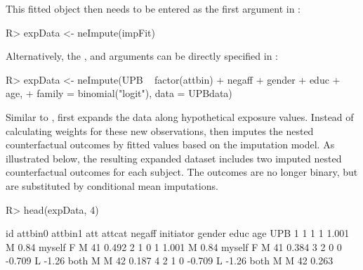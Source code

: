 \documentclass[nojss]{jss}
\begin{document}
\par This fitted object then needs to be entered as the first argument in :
\begin{Schunk}
\begin{Sinput}
R> expData <- neImpute(impFit)
\end{Sinput}
\end{Schunk}
Alternatively, the ,  and  arguments can be directly specified in :
\begin{Schunk}
\begin{Sinput}
R> expData <- neImpute(UPB ~ factor(attbin) + negaff + gender + educ + age,
+    family = binomial("logit"), data = UPBdata)
\end{Sinput}
\end{Schunk}
Similar to ,  first expands the data along hypothetical exposure values. Instead of calculating weights for these new observations,  then imputes the nested counterfactual outcomes by fitted values based on the imputation model. As illustrated below, the resulting expanded dataset includes two imputed nested counterfactual outcomes for each subject. The outcomes are no longer binary, but are substituted by conditional mean imputations.
\begin{Schunk}
\begin{Sinput}
R> head(expData, 4)
\end{Sinput}
\begin{Soutput}
  id attbin0 attbin1    att attcat negaff initiator gender educ age   UPB
1  1       1       1  1.001      M   0.84    myself      F    M  41 0.492
2  1       0       1  1.001      M   0.84    myself      F    M  41 0.384
3  2       0       0 -0.709      L  -1.26      both      M    M  42 0.187
4  2       1       0 -0.709      L  -1.26      both      M    M  42 0.263
\end{Soutput}
\end{Schunk}
\end{document}
